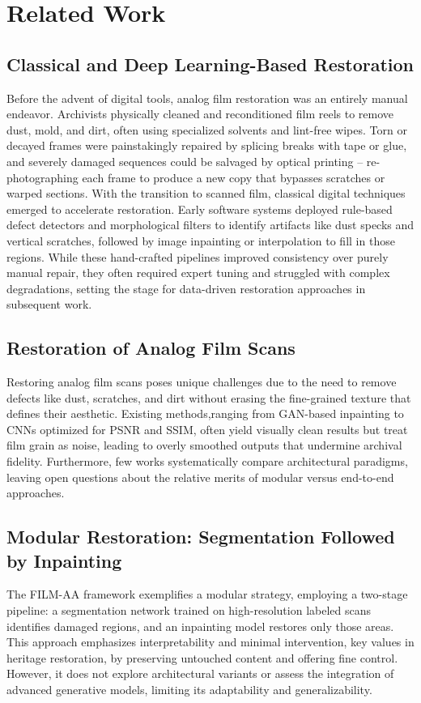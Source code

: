 \documentclass[10pt,a4paper,twocolumn,twoside]{article}
\begin{document}
\section{Related Work}
\subsection{Classical and Deep Learning-Based Restoration}
Before the advent of digital tools, analog film restoration was an entirely manual endeavor. Archivists physically cleaned and reconditioned film reels to remove dust, mold, and dirt, often using specialized solvents and lint-free wipes. Torn or decayed frames were painstakingly repaired by splicing breaks with tape or glue, and severely damaged sequences could be salvaged by optical printing – re-photographing each frame to produce a new copy that bypasses scratches or warped sections. With the transition to scanned film, classical digital techniques emerged to accelerate restoration. Early software systems deployed rule-based defect detectors and morphological filters to identify artifacts like dust specks and vertical scratches, followed by image inpainting or interpolation to fill in those regions. While these hand-crafted pipelines improved consistency over purely manual repair, they often required expert tuning and struggled with complex degradations, setting the stage for data-driven restoration approaches in subsequent work. \cite{croci2015advanced}

\subsection{Restoration of Analog Film Scans}
Restoring analog film scans poses unique challenges due to the need to remove defects like dust, scratches, and dirt without erasing the fine-grained texture that defines their aesthetic. Existing methods,ranging from GAN-based inpainting \cite{gan} to CNNs optimized for PSNR and SSIM, often yield visually clean results but treat film grain as noise, leading to overly smoothed outputs that undermine archival fidelity. Furthermore, few works systematically compare architectural paradigms, leaving open questions about the relative merits of modular versus end-to-end approaches. \cite{survey} \\ 
\subsection{Modular Restoration: Segmentation Followed by Inpainting}
The FILM-AA framework exemplifies a modular strategy, employing a two-stage pipeline: a segmentation network trained on high-resolution labeled scans identifies damaged regions, and an inpainting model restores only those areas. This approach emphasizes interpretability and minimal intervention, key values in heritage restoration, by preserving untouched content and offering fine control. However, it does not explore architectural variants or assess the integration of advanced generative models, limiting its adaptability and generalizability.\\
\end{document}
